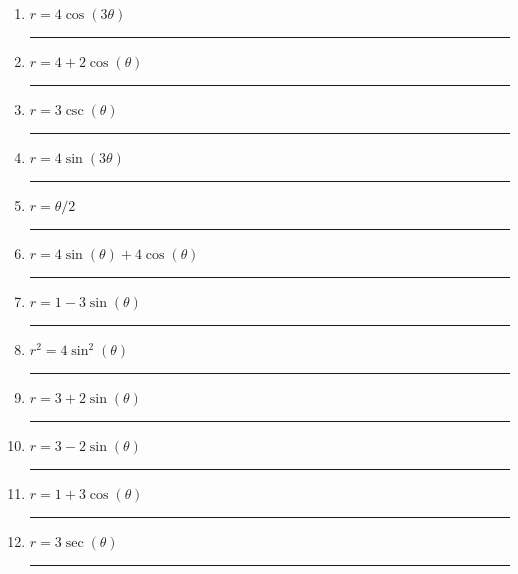 \documentclass[11pt]{exam}
\begin{document}
\begin{center}
\begin{tabular}{|c|c|c|}
\end{tabular}
\end{center}

\newcommand\aline[1]{\rule{0.5in}{0.2pt} }

\vspace{2ex}
\begin{multicols}{3}
	\begin{enumerate}
		\item $r=4\cos(3\theta)$ \aline{G}
		\item $r=4+2\cos(\theta)$ \aline{E}
		\item $r = 3\csc(\theta)$ \aline{L}
		\item $r=4\sin(3\theta)$ \aline{F}
		\item $r = \theta/2$ \aline{K}
		\item $r=4\sin(\theta)+4\cos(\theta)$ \aline{H}
		\item $r = 1-3\sin(\theta)$ \aline{A}
		\item $r^2=4\sin^2(\theta)$ \aline{I}
		\item $r = 3+2\sin(\theta)$ \aline{C}
		\item $r = 3-2\sin(\theta)$ \aline{D}
		\item $r = 1+3\cos(\theta)$ \aline{B}
		\item $r = 3\sec(\theta)$ \aline{J}
	\end{enumerate}
	\end{multicols}
\clearpage
\end{document}
